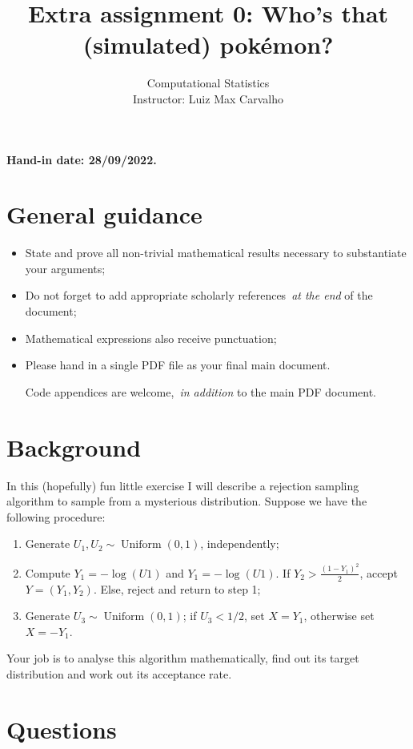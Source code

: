 \documentclass[a4paper,10pt, notitlepage]{report}
\title{Extra assignment 0: Who's that (simulated) pokémon?}
\author{Computational Statistics \\ Instructor: Luiz Max  Carvalho}
\begin{document}
\maketitle

\textbf{Hand-in date: 28/09/2022.}

\section*{General guidance}
\begin{itemize}
 \item State and prove all non-trivial mathematical results necessary to substantiate your arguments;
 \item Do not forget to add appropriate scholarly references~\textit{at the end} of the document;
 \item Mathematical expressions also receive punctuation;
 \item Please hand in a single PDF file as your final main document.
 
 Code appendices are welcome,~\textit{in addition} to the main PDF document.
 \end{itemize}

\section*{Background}

In this (hopefully) fun little exercise I will describe a rejection sampling algorithm to sample from a mysterious distribution.
Suppose we have the following procedure:
\begin{enumerate}
    \item Generate $U_1, U_2 \sim \operatorname{Uniform}(0, 1)$, independently;
    \item Compute $Y_1 = -\log(U1)$ and $Y_1 = -\log(U1)$.
    If $Y_2 > \frac{(1-Y_1)^2}{2}$, accept $Y = (Y_1, Y_2)$.
    Else, reject and return to step 1;
    \item Generate $U_3 \sim \operatorname{Uniform}(0, 1)$; if $U_3 < 1/2$, set $X = Y_1$, otherwise set $X = -Y_1$.
\end{enumerate}

Your job is to analyse this algorithm mathematically, find out its target distribution and work out its acceptance rate. 

\newpage

\section*{Questions}
\end{document}
